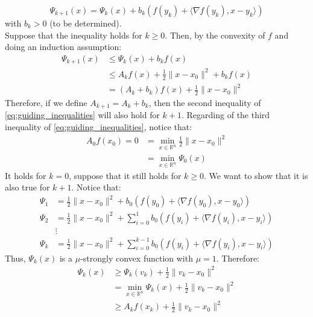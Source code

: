 \documentclass[12pt, openany]{report}
\newcommand{\R}{\mathbb{R}}
\theoremstyle{definition}
\begin{document}
\begin{equation}
	\Psi_{k+1} (x) = \Psi_k(x) + b_k \left(f(y_k)+\langle \nabla f(y_k),x-y_k\rangle \right)
\end{equation}
with $b_k > 0$ (to be determined). \\
Suppose that the inequality holds for $k \geq 0$. Then, by the convexity of $f$ and doing an induction assumption:
\begin{equation}
	\begin{aligned}
		\Psi_{k+1}(x) &\leq \Psi_k(x) + b_k f(x)\\
		&\leq A_k f(x) + \frac{1}{2} \|x-x_0\|^2 +b_kf(x)\\
		&= (A_k+b_k)f(x) + \frac{1}{2} \|x-x_0\|^2
	\end{aligned}
\end{equation}
Therefore, if we define $A_{k+1}=A_k+b_k$, then the second inequality of \eqref{eq:guiding_inequalities} will also hold for $k+1$. Regarding of the third inequality of \eqref{eq:guiding_inequalities}, notice that:
\begin{equation}
	\begin{aligned}
		A_0f(x_0) = 0 &= \min_{x \in \R^n} \frac{1}{2} \|x-x_0\|^2\\
		&= 	\min_{x \in \R^n} \Psi_0(x)
	\end{aligned}
\end{equation}
It holds for $k=0$, suppose that it still holds for $k\geq 0$. We want to show that it is also true for $k+1$. Notice that:
\begin{equation}
	\begin{aligned}
		\Psi_1 &= \frac{1}{2} \|x-x_0\|^2 + b_0 \left(f(y_0)+ \langle \nabla f(y_0), x-y_0 \rangle\right)\\
		\Psi_2 &= \frac{1}{2} \|x-x_0\|^2 + \sum_{i=0}^{1} b_0 \left(f(y_i)+ \langle \nabla f(y_i), x-y_i \rangle\right)\\
		&\vdots\\
		\Psi_k &= \frac{1}{2} \|x-x_0\|^2 + \sum_{i=0}^{k-1} b_0 \left(f(y_i)+ \langle \nabla f(y_i), x-y_i \rangle\right)
	\end{aligned}
\end{equation}
Thus, $\Psi_k(x)$ is a $\mu$-strongly convex function with $\mu=1$. Therefore:
\begin{equation}
	\begin{aligned}
		\Psi_k(x) &\geq \Psi_k(v_k) + \frac{1}{2} \|v_k-x_0\|^2\\
		&= \min_{x\in\R^n} \Psi_k(x) + \frac{1}{2} \|v_k-x_0\|^2\\
		&\geq A_k f(x_k) + \frac{1}{2} \|v_k-x_0\|^2
	\end{aligned}
\end{equation}
\end{document}
